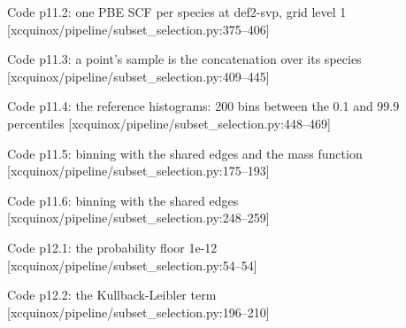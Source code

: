 \begin{frame}[allowframebreaks]{Code p11.2: one PBE SCF per species at def2-svp, grid level 1 [xcquinox/pipeline/subset\_selection.py:375--406]}
\label{code:p11_2_one_pbe_scf_per_species_at_def2_svp_grid}
\end{frame}
\begin{frame}[allowframebreaks]{Code p11.3: a point's sample is the concatenation over its species [xcquinox/pipeline/subset\_selection.py:409--445]}
\label{code:p11_3_a_point_s_sample_is_the_concatenation_ov}
\end{frame}
\begin{frame}[allowframebreaks]{Code p11.4: the reference histograms: 200 bins between the 0.1 and 99.9 percentiles [xcquinox/pipeline/subset\_selection.py:448--469]}
\label{code:p11_4_the_reference_histograms_200_bins_betwee}
\end{frame}
\begin{frame}[allowframebreaks]{Code p11.5: binning with the shared edges and the mass function [xcquinox/pipeline/subset\_selection.py:175--193]}
\label{code:p11_5_binning_with_the_shared_edges_and_the_ma}
\end{frame}
\begin{frame}[allowframebreaks]{Code p11.6: binning with the shared edges [xcquinox/pipeline/subset\_selection.py:248--259]}
\label{code:p11_6_binning_with_the_shared_edges}
\end{frame}
\begin{frame}[allowframebreaks]{Code p12.1: the probability floor 1e-12 [xcquinox/pipeline/subset\_selection.py:54--54]}
\label{code:p12_1_the_probability_floor_1e_12}
\end{frame}
\begin{frame}[allowframebreaks]{Code p12.2: the Kullback-Leibler term [xcquinox/pipeline/subset\_selection.py:196--210]}
\label{code:p12_2_the_kullback_leibler_term}
\end{frame}
